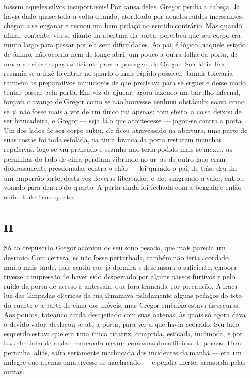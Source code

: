 fossem aqueles silvos insuportáveis! Por causa deles, Gregor perdia a
cabeça. Já havia dado quase toda a volta quando, atordoado por aqueles
ruídos incessantes, chegou a se enganar e recuou um bom pedaço no sentido
contrário. Mas quando afinal, contente, viu-se diante da abertura da
porta, percebeu que seu corpo era muito largo para passar por ela sem
dificuldades. Ao pai, é lógico, naquele estado de ânimo, não ocorria nem
de longe abrir um pouco a outra folha da porta, de modo a deixar espaço
suficiente para a passagem de Gregor. Sua ideia fixa resumia-se a fazê-lo
entrar no quarto o mais rápido possível. Jamais toleraria também os
preparativos minuciosos de que precisava para se erguer e desse modo
tentar passar pela porta. Em vez de ajudar, agora fazendo um barulho infernal,
forçava o avanço de Gregor como se não houvesse nenhum obstáculo; soava
como se já não fosse mais a voz de um único pai apenas; com efeito, a
coisa deixou de ser brincadeira, e Gregor --- seja lá o que acontecesse ---
jogou-se contra a porta. Um dos lados de seu corpo subiu, ele ficou
atravessado na abertura, uma parte de suas costas foi toda esfolada, na
tinta branca da porta restaram manchas repulsivas, logo se viu prensado e
sozinho não teria podido mais se mexer, as perninhas do lado de cima
pendiam vibrando no ar, as do outro lado eram dolorosamente pressionadas
contra o chão --- foi quando o pai, de trás, deu-lhe um empurrão forte,
desta vez deveras libertador, e ele, sangrando a valer, entrou voando para
dentro do quarto. A porta ainda foi fechada com a bengala e então enfim
tudo ficou quieto. 

\chapter*{}
\openany
\section{II}

\noindent{}Só ao crepúsculo Gregor acordou de seu sono pesado, que mais parecia um
desmaio. Com certeza, se não fosse perturbado, também não teria acordado
muito mais tarde, pois sentia que já dormira e descansara o suficiente,
embora tivesse a impressão de haver sido despertado por alguns passos
furtivos e pelo ruído da porta de acesso à antessala, que fora trancada
por precaução. A fraca luz das lâmpadas elétricas da rua iluminava
palidamente alguns pedaços do teto do quarto e a parte de cima dos móveis,
mas Gregor embaixo estava às escuras. Aos poucos, tateando ainda
desajeitado com suas antenas, às quais só agora dava o devido valor,
deslocou-se até a porta, para ver o que havia ocorrido. Seu lado esquerdo
estava que era uma única cicatriz, comprida, esticada, incômoda, e por
isso ele tinha de andar mancando mesmo com suas duas fileiras de pernas.
Uma perninha, aliás, saíra seriamente machucada dos incidentes da manhã ---
era um milagre que apenas uma tivesse se machucado --- e pendia inerte,
arrastada pelas outras.

